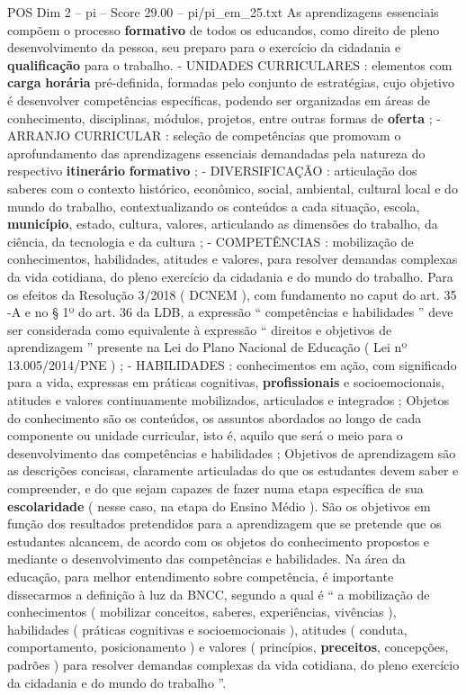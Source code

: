 \begin{textsample}{POS Dim 2 – pi – Score 29.00 – pi/pi\_em\_25.txt}
As aprendizagens essenciais compõem o processo \textbf{formativo} de todos os educandos, como direito de pleno desenvolvimento da pessoa, seu preparo para o exercício da cidadania e \textbf{qualificação} para o trabalho. - UNIDADES CURRICULARES : elementos com \textbf{carga} \textbf{horária} pré-definida, formadas pelo conjunto de estratégias, cujo objetivo é desenvolver competências específicas, podendo ser organizadas em áreas de conhecimento, disciplinas, módulos, projetos, entre outras formas de \textbf{oferta} ; - ARRANJO CURRICULAR : seleção de competências que promovam o aprofundamento das aprendizagens essenciais demandadas pela natureza do respectivo \textbf{itinerário} \textbf{formativo} ; - DIVERSIFICAÇÃO : articulação dos saberes com o contexto histórico, econômico, social, ambiental, cultural local e do mundo do trabalho, contextualizando os conteúdos a cada situação, escola, \textbf{município}, estado, cultura, valores, articulando as dimensões do trabalho, da ciência, da tecnologia e da cultura ; - COMPETÊNCIAS : mobilização de conhecimentos, habilidades, atitudes e valores, para resolver demandas complexas da vida cotidiana, do pleno exercício da cidadania e do mundo do trabalho.
Para os efeitos da Resolução 3/2018 ( DCNEM ), com fundamento no caput do art. 35 -A e no § 1º do art. 36 da LDB, a expressão “ competências e habilidades ” deve ser considerada como equivalente à expressão “ direitos e objetivos de aprendizagem ” presente na Lei do Plano Nacional de Educação ( Lei nº 13.005/2014/PNE ) ; - HABILIDADES : conhecimentos em ação, com significado para a vida, expressas em práticas cognitivas, \textbf{profissionais} e socioemocionais, atitudes e valores continuamente mobilizados, articulados e integrados ; Objetos do conhecimento são os conteúdos, os assuntos abordados ao longo de cada componente ou unidade curricular, isto é, aquilo que será o meio para o desenvolvimento das competências e habilidades ; Objetivos de aprendizagem são as descrições concisas, claramente articuladas do que os estudantes devem saber e compreender, e do que sejam capazes de fazer numa etapa específica de sua \textbf{escolaridade} ( nesse caso, na etapa do Ensino Médio ).
São os objetivos em função dos resultados pretendidos para a aprendizagem que se pretende que os estudantes alcancem, de acordo com os objetos do conhecimento propostos e mediante o desenvolvimento das competências e habilidades.
Na área da educação, para melhor entendimento sobre competência, é importante dissecarmos a definição à luz da BNCC, segundo a qual é “ a mobilização de conhecimentos ( mobilizar conceitos, saberes, experiências, vivências ), habilidades ( práticas cognitivas e socioemocionais ), atitudes ( conduta, comportamento, posicionamento ) e valores ( princípios, \textbf{preceitos}, concepções, padrões ) para resolver demandas complexas da vida cotidiana, do pleno exercício da cidadania e do mundo do trabalho ”.

\end{textsample}
